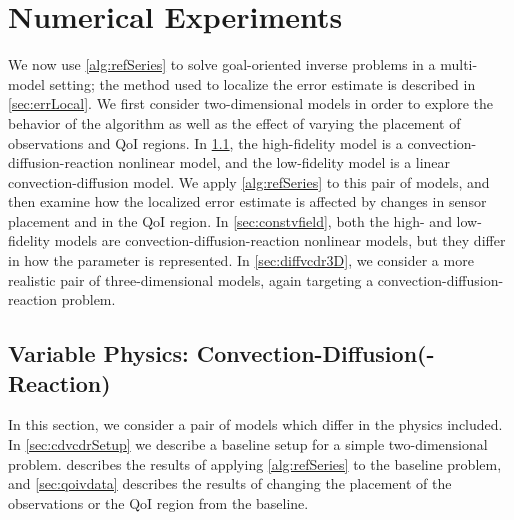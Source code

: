 \documentclass[review]{siamart0516}
\begin{document}
\section{Numerical Experiments}\label{sec:numexp}
%
We now use \cref{alg:refSeries} to solve goal-oriented inverse problems in a multi-model setting; the method used to localize the error estimate is described in \cref{sec:errLocal}. We first consider two-dimensional models in order to explore the behavior of the algorithm as well as the effect of varying the placement of observations and QoI regions. In \cref{sec:cdvcdr}, the high-fidelity model is a convection-diffusion-reaction nonlinear model, and the low-fidelity model is a linear convection-diffusion model. We apply \cref{alg:refSeries} to this pair of models, and then examine how the localized error estimate is affected by changes in sensor placement and in the QoI region. In \cref{sec:constvfield}, both the high- and low-fidelity models are convection-diffusion-reaction nonlinear models, but they differ in how the parameter is represented. In \cref{sec:diffvcdr3D}, we consider a more realistic pair of three-dimensional models, again targeting a convection-diffusion-reaction problem.


\subsection{Variable Physics: Convection-Diffusion(-Reaction)} \label{sec:cdvcdr}
In this section, we consider a pair of models which differ in the physics included. In \cref{sec:cdvcdrSetup} we describe a baseline setup for a simple two-dimensional problem.  describes the results of applying \cref{alg:refSeries} to the baseline problem, and \cref{sec:qoivdata} describes the results of changing the placement of the observations or the QoI region from the baseline.
%
\end{document}
